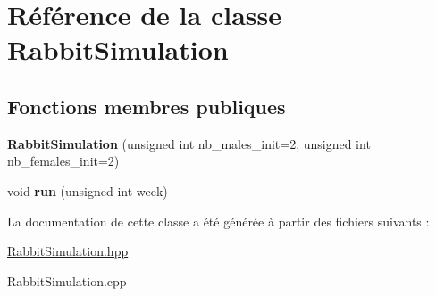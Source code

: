 \hypertarget{classRabbitSimulation}{}\section{Référence de la classe Rabbit\+Simulation}
\label{classRabbitSimulation}
\subsection*{Fonctions membres publiques}
\begin{DoxyCompactItemize}
\item 
\mbox{\label{classRabbitSimulation_a7cff4ba08c71c15ee2eb109128a48c5c}} 
{\bfseries Rabbit\+Simulation} (unsigned int nb\+\_\+males\+\_\+init=2, unsigned int nb\+\_\+females\+\_\+init=2)
\item 
\mbox{\label{classRabbitSimulation_a8c033edc85bb3b72a4704e48ba699e20}} 
void {\bfseries run} (unsigned int week)
\end{DoxyCompactItemize}


La documentation de cette classe a été générée à partir des fichiers suivants \+:\begin{DoxyCompactItemize}
\item 
\hyperlink{RabbitSimulation_8hpp}{Rabbit\+Simulation.\+hpp}\item 
Rabbit\+Simulation.\+cpp\end{DoxyCompactItemize}
